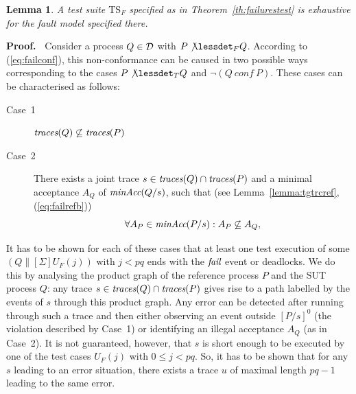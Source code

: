 \documentclass[3p,times]{elsarticle}
\newcommand{\trc}{\text{\it traces}}
\newcommand{\efail}{{\text{\it fail}}}
\newcommand{\TS}{{\text{TS}}}
\newcommand{\minaccs}{\text{\it minAcc}}
\newtheorem{lemma}{Lemma}
\newenvironment{proof}[1][]
{

\medskip
\noindent
{\bf Proof.\ }}
{
}
\begin{document}
%
\begin{lemma}\label{lemma:mainfexhaustive}
A test suite $\TS_F$ specified as in Theorem~\ref{th:failurestest} is
exhaustive for the fault model specified there.
\end{lemma}
\begin{proof}
Consider a process $Q\in{\cal D}$ with $P\not\lessdet_F Q$. According to
(\ref{eq:failconf}), this non-conformance can be caused in two possible ways
corresponding to the cases $P\not\lessdet_T Q$ and $\neg(Q\ conf\ P)$. These
cases can be characterised as follows:
\begin{description}
\item[Case~1] $\trc(Q)\not\subseteq \trc(P)$
\item[Case~2] There exists a joint trace $s\in\trc(Q)\cap\trc(P)$ and a
    minimal acceptance $A_Q$ of $\minaccs(Q/s)$, such that (see
    Lemma~\ref{lemma:tgtrcref}, (\ref{eq:failrefb}))
\begin{equation}
\label{eq:accsnotcontained}
\forall A_P\in\minaccs(P/s): A_P\not\subseteq A_Q,
\end{equation}
\end{description}
It has to be shown for each of these cases that at least one test execution
of some $(Q\parallel[\Sigma] U_F(j))$ with $j < pq$ ends with the $\efail$
event or deadlocks. We do this by analysing the product graph of the
reference process $P$ and the SUT process $Q$: any trace
$s\in\trc(Q)\cap\trc(P)$ gives rise to a path labelled by the events of $s$
through this product graph. Any error can be detected after running through
such a trace and then either observing an event outside $[P/s]^0$ (the
violation described by Case~1) or identifying an illegal acceptance $A_Q$ (as
in Case~2). It is not guaranteed, however, that $s$ is short enough to be
executed by one of the test cases $U_F(j)$ with $0\le j < pq$. So, it has to
be shown that for any $s$ leading to an error situation, there exists a trace
$u$ of maximal length $pq-1$ leading to the same error.


\end{proof}
\end{document}
